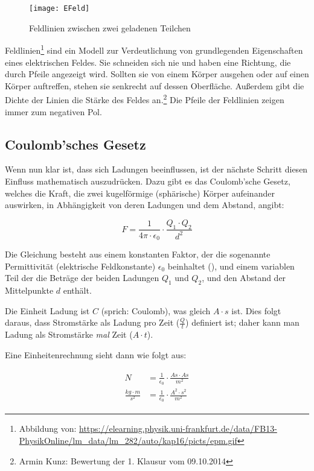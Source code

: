 \begin{figure}
	\centering
	\texttt{[image: EFeld]}
	\caption{Feldlinien zwischen zwei geladenen Teilchen}
\end{figure}

Feldlinien\footnote{Abbildung von: \url{https://elearning.physik.uni-frankfurt.de/data/FB13-PhysikOnline/lm_data/lm_282/auto/kap16/picts/epm.gif}} sind ein Modell zur Verdeutlichung von grundlegenden Eigenschaften eines elektrischen Feldes. Sie schneiden sich nie und haben eine Richtung, die durch Pfeile angezeigt wird. Sollten sie von einem Körper ausgehen oder auf einen Körper auftreffen, stehen sie senkrecht auf dessen Oberfläche. Außerdem gibt die Dichte der Linien die Stärke des Feldes an.\footnote{Armin Kunz: Bewertung der 1. Klausur vom 09.10.2014} Die Pfeile der Feldlinien zeigen immer zum negativen Pol.


\subsection{Coulomb'sches Gesetz} \label{subsec:CoulombGesetz}

Wenn nun klar ist, dass sich Ladungen beeinflussen, ist der nächste Schritt diesen \glqq Einfluss\grqq{} mathematisch auszudrücken. Dazu gibt es das Coulomb'sche Gesetz, welches die Kraft, die zwei kugelförmige (sphärische) Körper aufeinander auswirken, in Abhängigkeit von deren Ladungen und dem Abstand, angibt:

\begin{equation} \label{eq:coulomb_gesetz}
	F = \frac{1}{4\pi \cdot \epsilon_0} \cdot \frac{Q_1 \cdot Q_2}{d^{2}}
\end{equation}

Die Gleichung besteht aus einem konstanten Faktor, der die sogenannte \glqq Permittivität\grqq{} (\glqq elektrische Feldkonstante\grqq ) $\epsilon_0$ beinhaltet (), und einem variablen Teil der die Beträge der beiden Ladungen $Q_1$ und $Q_2$, und den Abstand der Mittelpunkte $d$ enthält.

Die Einheit Ladung ist $C$ (sprich: \glqq Coulomb\grqq ), was gleich $A \cdot s$ ist. Dies folgt daraus, dass Stromstärke als Ladung pro Zeit ($\frac{Q}{t}$) definiert ist; daher kann man Ladung als Stromstärke \emph{mal} Zeit ($A \cdot t$).

Eine Einheitenrechnung sieht dann wie folgt aus:

\begin{align}\label{eq:coulomb_gesetz_einheiten}
\begin{split}
	N 							&= \frac{1}{\epsilon_0} \cdot \frac{As \cdot As}{m^{2}} \\
	\frac{kg \cdot m}{s^{2}} 	&= \frac{1}{\epsilon_0} \cdot \frac{A^{2} \cdot s^{2}}{m^{2}}
\end{split}
\end{align}

